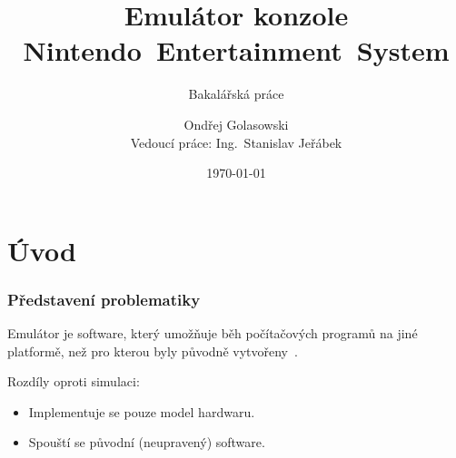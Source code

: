 \documentclass{beamer}
\title[Emulátor konzole NES]{Emulátor konzole Nintendo~Entertainment~System}
\subtitle{Bakalářská práce}
\author[Ondřej Golasowski]{Ondřej Golasowski\texorpdfstring{\\}{}Vedoucí práce: Ing.~Stanislav Jeřábek}
\institute[FIT ČVUT]{Katedra číslicového návrhu, FIT ČVUT}
\date{\today}
\begin{document}
	
\begingroup
{}
\begin{frame}[noframenumbering]
	\titlepage
\end{frame}
\endgroup

\section{Úvod}
\begin{frame}
	\frametitle{Představení problematiky}
	\begin{definice}[Emulátor]
		Emulátor je software, který umožňuje běh počítačových programů na jiné platformě, než pro kterou byly původně vytvořeny~.
	\end{definice}
	\pause
	Rozdíly oproti simulaci:
	\begin{itemize}
		\item Implementuje se pouze model hardwaru.
		\item Spouští se původní (neupravený) software.
	\end{itemize}
\end{frame}

\end{document}
